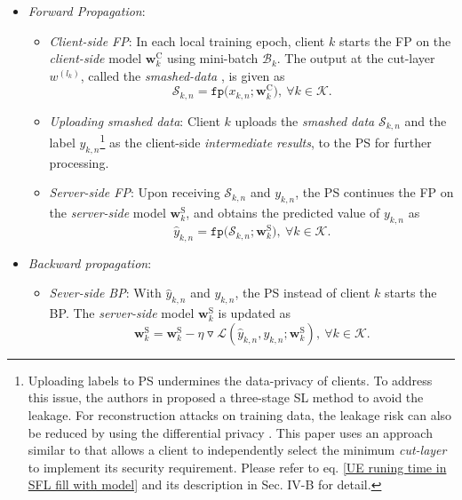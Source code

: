 \documentclass[10pt,journal,transmag]{IEEEtran}
\begin{document}
\begin{itemize}
    \item \textit{Forward Propagation}:
    \begin{itemize}
        \item[(1)] \textit{Client-side FP}: In each local training epoch, client $k$ starts the FP on the \textit{client-side} model $\textbf{w}^\text{C}_k$ using mini-batch $\mathcal{B}_k$. The output at the cut-layer $w^{(l_k)}$, called the \textit{smashed-data} \cite{9812907}, is given as
        \begin{equation}
            \mathcal{S}_{k,n} = \texttt{fp}\big(x_{k,n}; \textbf{w}^\text{C}_k\big),\  \forall k \in \mathcal{K}.
        \end{equation}
        
        \item[(2)] \textit{Uploading smashed data}: Client $k$ uploads the \textit{smashed data} $\mathcal{S}_{k,n}$ and the label $y_{k,n}$\footnote{Uploading labels to PS undermines the data-privacy of clients. To address this issue, the authors in \cite{10.1145/3559613.35632011111} proposed a three-stage SL method to avoid the leakage. For reconstruction attacks on training data, the leakage risk can also be reduced by using the differential privacy \cite{9609550}\cite{10097035}. This paper uses an approach similar to \cite{9812907} that allows a client to independently select the minimum \textit{cut-layer} to implement its security requirement. Please refer to eq. \eqref{UE runing time in SFL fill with model} and its description in Sec. IV-B for detail.} as the client-side \textit{intermediate results}, to the PS for further processing. 
    
        \item[(3)] \textit{Server-side FP}: Upon receiving $\mathcal{S}_{k,n}$ and $y_{k,n}$, the PS continues the FP on the \textit{server-side} model $\textbf{w}^\text{S}_k$, and obtains the predicted value of $y_{k,n}$ as 
        \begin{equation}
            \hat{y}_{k,n} = \texttt{fp}\big(\mathcal{S}_{k,n}; \textbf{w}^\text{S}_k\big),\  \forall k \in \mathcal{K}.
        \end{equation}
    \end{itemize}

    \item \textit{Backward propagation}:
    
    \begin{itemize}
        \item[(4)] \textit{Sever-side BP}: With $\hat{y}_{k,n}$ and $y_{k,n}$, the PS instead of client $k$ starts the BP. The \textit{server-side} model $\textbf{w}^\text{S}_k$ is updated as
        \begin{equation}
            \textbf{w}^\text{S}_k = \textbf{w}^\text{S}_k - \eta \triangledown \mathcal{L}(\hat{y}_{k,n}, y_{k,n}; \textbf{w}^\text{S}_k),\  \forall k \in \mathcal{K}.
        \end{equation}


\end{itemize}
\end{itemize}
\end{document}
